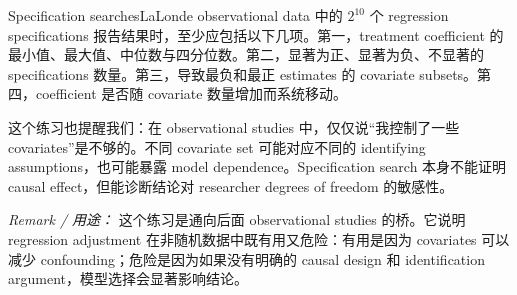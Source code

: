 \begin{exercisesolution}{Specification searches}{LaLonde observational data 中的 $2^{10}$ 个 regression specifications}
报告结果时，至少应包括以下几项。第一，treatment coefficient 的最小值、最大值、中位数与四分位数。第二，显著为正、显著为负、不显著的 specifications 数量。第三，导致最负和最正 estimates 的 covariate subsets。第四，coefficient 是否随 covariate 数量增加而系统移动。

这个练习也提醒我们：在 observational studies 中，仅仅说“我控制了一些 covariates”是不够的。不同 covariate set 可能对应不同的 identifying assumptions，也可能暴露 model dependence。Specification search 本身不能证明 causal effect，但能诊断结论对 researcher degrees of freedom 的敏感性。

\emph{Remark / 用途：} 这个练习是通向后面 observational studies 的桥。它说明 regression adjustment 在非随机数据中既有用又危险：有用是因为 covariates 可以减少 confounding；危险是因为如果没有明确的 causal design 和 identification argument，模型选择会显著影响结论。
\end{exercisesolution}

